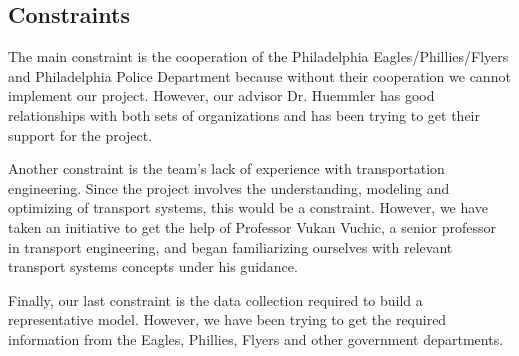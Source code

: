 \subsection{Constraints}
The main constraint is the cooperation of the Philadelphia
Eagles/Phillies/Flyers and Philadelphia Police Department because without
their cooperation we cannot implement our project. However, our
advisor Dr. Huemmler has good relationships with both sets of organizations
and has been trying to get their support for the project.

Another constraint is the team's lack of experience with
transportation engineering.  Since the project involves the
understanding, modeling and optimizing of transport systems, this
would be a constraint. However, we have taken an initiative to get the
help of Professor Vukan Vuchic, a senior professor in transport
engineering, and began familiarizing ourselves with relevant transport
systems concepts under his guidance.

Finally, our last constraint is the data collection required to build
a representative model. However, we have been trying to get the
required information from the Eagles, Phillies, Flyers and other government
departments.

